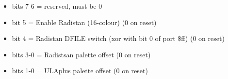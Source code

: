 \begin{itemize}
\item bits 7-6 = reserved, must be 0
\item bit 5 = Enable Radistan (16-colour) (0 on reset)
\item bit 4 = Radistan DFILE switch (xor with bit 0 of port \$ff) (0
  on reset)
\item bits 3-0 = Radistsan palette offset (0 on reset)
\item bits 1-0 = ULAplus palette offset (0 on reset)
\end{itemize}

